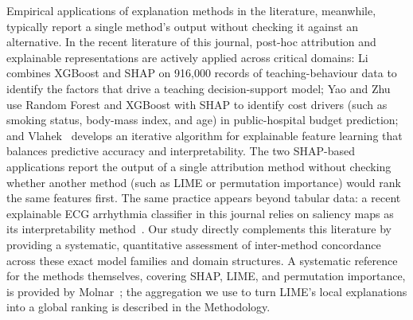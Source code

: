 \documentclass[11pt,twoside,a4paper]{article}
\begin{document}
Empirical applications of explanation methods in the literature, meanwhile, typically report a single method's output without checking it against an alternative. In the recent literature of this journal, post-hoc attribution and explainable representations are actively applied across critical domains: Li~\citep{li2025mining} combines XGBoost and SHAP on 916,000 records of teaching-behaviour data to identify the factors that drive a teaching decision-support model; Yao and Zhu~\citep{yao2025optimizing} use Random Forest and XGBoost with SHAP to identify cost drivers (such as smoking status, body-mass index, and age) in public-hospital budget prediction; and Vlahek~\citep{vlahek2024efficient} develops an iterative algorithm for explainable feature learning that balances predictive accuracy and interpretability. The two SHAP-based applications report the output of a single attribution method without checking whether another method (such as LIME or permutation importance) would rank the same features first. The same practice appears beyond tabular data: a recent explainable ECG arrhythmia classifier in this journal relies on saliency maps as its interpretability method~\citep{fahim2026ecg}. Our study directly complements this literature by providing a systematic, quantitative assessment of inter-method concordance across these exact model families and domain structures. A systematic reference for the methods themselves, covering SHAP, LIME, and permutation importance, is provided by Molnar~\citep{molnar2022iml}; the aggregation we use to turn LIME's local explanations into a global ranking is described in the Methodology.
\end{document}
